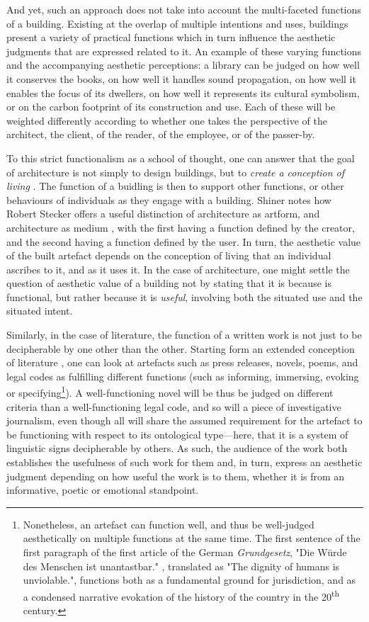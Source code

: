 And yet, such an approach does not take into account the multi-faceted functions of a building. Existing at the overlap of multiple intentions and uses, buildings present a variety of practical functions which in turn influence the aesthetic judgments that are expressed related to it. An example of these varying functions and the accompanying aesthetic perceptions: a library can be judged on how well it conserves the books, on how well it handles sound propagation, on how well it enables the focus of its dwellers, on how well it represents its cultural symbolism, or on the carbon footprint of its construction and use. Each of these will be weighted differently according to whether one takes the perspective of the architect, the client, of the reader, of the employee, or of the passer-by.

To this strict functionalism as a school of thought, one can answer that the goal of architecture is not simply to design buildings, but to \emph{create a conception of living} \citep{graham_architecture_2000}. The function of a buidling is then to support other functions, or other behaviours of individuals as they engage with a building. Shiner notes how Robert Stecker offers a useful distinction of architecture as artform, and architecture as medium \citep{shiner_functional_2009}, with the first having a function defined by the creator, and the second having a function defined by the user. In turn, the aesthetic value of the built artefact depends on the conception of living that an individual ascribes to it, and as it uses it. In the case of architecture, one might settle the question of aesthetic value of  a building not by stating that it is because is functional, but rather because it is \emph{useful}, involving both the situated use and the situated intent.

Similarly, in the case of literature, the function of a written work is not just to be decipherable by one other than the other. Starting form an extended conception of literature \citep{gefen_extension_2019}, one can look at artefacts such as press releases, novels, poems, and legal codes as fulfilling different functions (such as informing, immersing, evoking or specifying\footnote{Nonetheless, an artefact can function well, and thus be well-judged aesthetically on multiple functions at the same time. The first sentence of the first paragraph of the first article of the German \emph{Grundgesetz}, "Die Würde des Menschen ist unantastbar." \citep{deutschebundestag_gg_2022}, translated as "The dignity of humans is unviolable.", functions both as a fundamental ground for jurisdiction, and as a condensed narrative evokation of the history of the country in the 20\textsuperscript{th} century.}). A well-functioning novel will be thus be judged on different criteria than a well-functioning legal code, and so will a piece of investigative journalism, even though all will share the assumed requirement for the artefact to be functioning with respect to its ontological type—here, that it is a system of linguistic signs decipherable by others. As such, the audience of the work both establishes the usefulness of such work for them and, in turn, express an aesthetic judgment depending on how useful the work is to them, whether it is from an informative, poetic or emotional standpoint.

